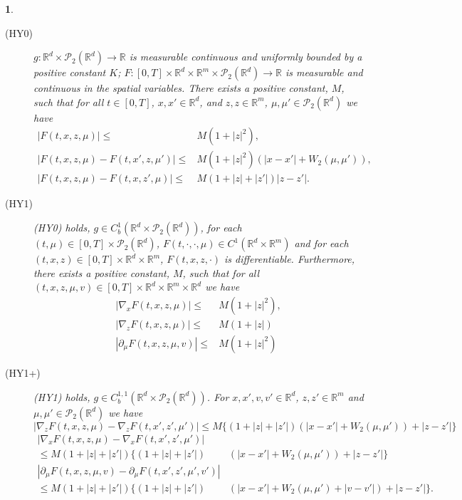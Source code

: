 \documentclass[12,english]{amsart}
\theoremstyle{plain}
\theoremstyle{definition}
\theoremstyle{plain}
\newtheorem{assumption}{\protect\assumptionname}
\theoremstyle{plain}
\theoremstyle{remark}
\providecommand{\assumptionname}{Assumption}
\newcommand{\R}{\mathbb R}
\newcommand{\cP}{\mathcal P}
\begin{document}
\begin{assumption}
  \label{assu:A3}\quad
\begin{description}
\item [(HY0)] 
  $g:\R^d \times\cP_2(\R^d)\to \R$ is measurable
continuous and uniformly bounded by a positive constant
$K$; $F:[0,T]\times\R^d\times\R^m\times\cP_2(\R^d)\to \R$
is measurable and continuous in the spatial variables.
There exists a positive constant, $M$, such that for
all $t\in[0,T]$, $x,x'\in\R^d$, and $z,z\in\R^m$, $\mu, \mu'\in\cP_2(\R^d)$
we have
\begin{align*}
|F(t,x,z,\mu)|\leq & M(1+|z|^2),\\
|F(t,x,z,\mu)-F(t,x',z,\mu')|\leq & M(1+|z|^2)(|x-x'|+W_2(\mu,\mu')),\\
|F(t,x,z,\mu)-F(t,x,z',\mu)|\leq & M (1+|z|+|z'|)|z-z'| .
\end{align*}
\item [(HY1)] (HY0) holds, $g\in C_b^1(\R^d\times\cP_2(\R^d))$,
for each $(t,\mu)\in [0,T]\times\cP_2(\R^d)$, $F(t, \cdot, \cdot,\mu)\in C^1(\R^d\times\R^m)$ and for each $(t, x, z)\in [0,T]\times\R^d\times\R^m$,
$F(t,x, z, \cdot)$ is differentiable.
Furthermore, there exists a positive constant, $M$, such that for all
$(t,x,z,\mu,v)\in[0,T]\times\mathbb{\R}^d\times\R^m\times\R^d$ 
we have
\begin{align*}%
|\nabla_xF(t,x,z,\mu)|\leq & M(1+|z|^2),\\%
|\nabla_z F(t,x,z,\mu)|\leq & M(1+|z|)\\%
|\partial_\mu F(t,x,z,\mu,v)|\leq & M(1+|z|^2)
\end{align*}
\item [(HY1+)] (HY1) holds, $g\in C_b^{1,1}(\R^d\times\cP_2(\R^d))$. 
For $x,x',v,v'\in\R^d$,
  $z,z'\in\R^m$  and   $\mu,\mu'\in\cP_2(\R^d)$ we have
  \begin{equation}
    \label{hy22}
    |\nabla_{z}F(t,x,z,\mu)-\nabla_{z}F(t,x',z',\mu')|\leq M
  \{(1+|z|+|z'|)(|x-x'|+W_2(\mu,\mu'))+|z-z'|\} 
  \end{equation}
\begin{align*}%
  |\nabla_xF(t,x,z,\mu)-\nabla_xF(t,x',z',\mu')|&\\
  \leq M(1+|z|+|z'|)\{ (1+|z|+|z'|)&(|x-x'|+W_2(\mu,\mu'))+|z-z'|\} 
  \\%
  |\partial_\mu F(t,x,z,\mu,v)-\partial_\mu F(t,x',z',\mu',v')|&\\
  \leq M(1+|z|+|z'|)\{ (1+|z|+|z'|)&(|x-x'|+W_2(\mu,\mu')+|v-v'|)+|z-z'|\}.
  \end{align*}
\end{description}
\end{assumption}
\end{document}
